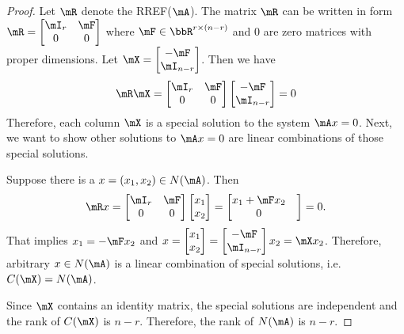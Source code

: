 \documentclass[11pt]{article}
\theoremstyle{plain}
\theoremstyle{definition}
\begin{document}
\begin{proof} Let $\mR$ denote the RREF($\mA$). The matrix $\mR$ can be written in form $\mR = \begin{bmatrix} \mI_r & \mF \\ 0 & 0	\end{bmatrix}$ where $\mF \in \bbR^{r \times (n-r)}$ and $0$ are zero matrices with proper dimensions.
Let $\mX = \begin{bmatrix} -\mF \\ \mI_{n-r}	\end{bmatrix}$. Then we have 
\begin{align}
	\mR \mX = \begin{bmatrix} \mI_r & \mF \\ 0 & 0	\end{bmatrix} \begin{bmatrix} -\mF \\ \mI_{n-r}	\end{bmatrix} = 0
\end{align}
Therefore, each column $\mX$ is a special solution to the system $\mA x = 0$. Next, we want to show other solutions to $\mA x = 0$ are linear combinations of those special solutions.

Suppose there is a $x = (x_1, x_2) \in N(\mA)$. Then 
\begin{align}
	\mR x = \begin{bmatrix} \mI_r & \mF \\ 0 & 0	\end{bmatrix} \begin{bmatrix} x_1 \\ x_2	\end{bmatrix} = \begin{bmatrix} x_1 + \mF x_2 \\  0 &\end{bmatrix} = 0.
\end{align}
That implies $x_1  = -\mF x_2$ and $x = \begin{bmatrix} x_1 \\ x_2	\end{bmatrix} = \begin{bmatrix} -\mF \\ \mI_{n-r}	\end{bmatrix} x_2 = \mX x_2$. Therefore, arbitrary $x \in N(\mA)$ is a linear combination of special solutions, i.e. $C(\mX) = N(\mA)$. 

Since $\mX$ contains an identity matrix, the special solutions are independent and the rank of $C(\mX)$ is $n -r$. Therefore, the rank of $N(\mA)$ is $n-r$. 
\end{proof}
\end{document}
